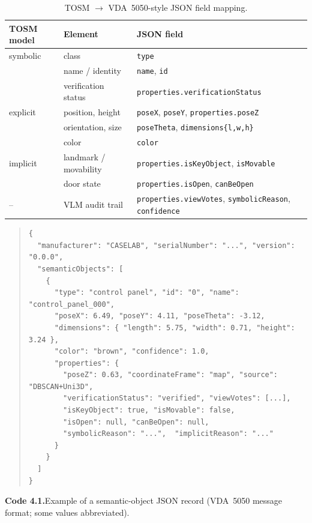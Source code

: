 \begin{table}[htbp]
  \centering
  \caption{TOSM $\to$ VDA~5050-style JSON field mapping.}
  \label{tab:mapping}
  \begin{tabularx}{\textwidth}{l l X}
    \toprule
    \textbf{TOSM model} & \textbf{Element} & \textbf{JSON field} \\
    \midrule
    symbolic & class & \texttt{type} \\
             & name / identity & \texttt{name}, \texttt{id} \\
             & verification status & \texttt{properties.verificationStatus} \\
    explicit & position, height & \texttt{poseX}, \texttt{poseY}, \texttt{properties.poseZ} \\
             & orientation, size & \texttt{poseTheta}, \texttt{dimensions\{l,w,h\}} \\
             & color & \texttt{color} \\
    implicit & landmark / movability & \texttt{properties.isKeyObject}, \texttt{isMovable} \\
             & door state & \texttt{properties.isOpen}, \texttt{canBeOpen} \\
    --       & VLM audit trail & \texttt{properties.viewVotes}, \texttt{symbolicReason}, \texttt{confidence} \\
    \bottomrule
  \end{tabularx}
\end{table}

\begin{quote}
\small\ttfamily
\begin{verbatim}
{
  "manufacturer": "CASELAB", "serialNumber": "...", "version": "0.0.0",
  "semanticObjects": [
    {
      "type": "control panel", "id": "0", "name": "control_panel_000",
      "poseX": 6.49, "poseY": 4.11, "poseTheta": -3.12,
      "dimensions": { "length": 5.75, "width": 0.71, "height": 3.24 },
      "color": "brown", "confidence": 1.0,
      "properties": {
        "poseZ": 0.63, "coordinateFrame": "map", "source": "DBSCAN+Uni3D",
        "verificationStatus": "verified", "viewVotes": [...],
        "isKeyObject": true, "isMovable": false,
        "isOpen": null, "canBeOpen": null,
        "symbolicReason": "...",  "implicitReason": "..."
      }
    }
  ]
}
\end{verbatim}
\end{quote}
\noindent\textbf{Code 4.1.}\quad Example of a semantic-object JSON record
(VDA~5050 message format; some values abbreviated).
\label{code:record}
\medskip

